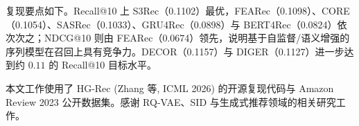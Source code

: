 \documentclass[sigconf, nonacm, anonymize, 9pt]{acmart}
\begin{document}
复现要点如下。Recall@10 上 S3Rec（0.1102）最优，FEARec（0.1098）、CORE（0.1054）、SASRec（0.1033）、GRU4Rec（0.0898）与 BERT4Rec（0.0824）依次次之；NDCG@10 则由 FEARec（0.0674）领先，说明基于自监督/语义增强的序列模型在召回上具有竞争力。DECOR（0.1157）与 DIGER（0.1127）进一步达到约 $0.11$ 的 Recall@10 目标水平。


\begin{acks}
本文工作使用了 HG-Rec (Zhang 等, ICML 2026) 的开源复现代码与 Amazon Review 2023 公开数据集。感谢 RQ-VAE、SID 与生成式推荐领域的相关研究工作。
\end{acks}



\end{document}
